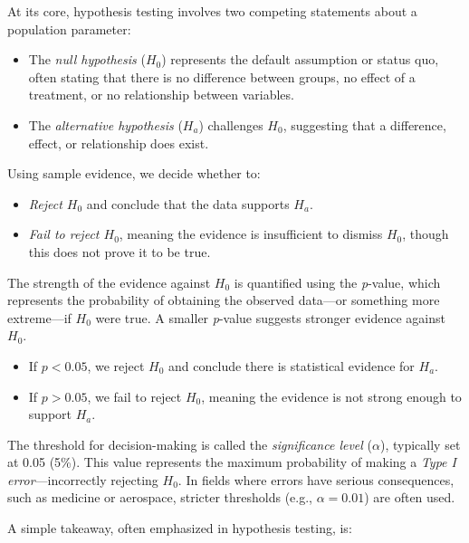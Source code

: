 \documentclass[
]{book}
\providecommand{\tightlist}{%
  \setlength{\itemsep}{0pt}\setlength{\parskip}{0pt}}
\theoremstyle{definition}
\theoremstyle{definition}
\theoremstyle{definition}
\theoremstyle{definition}
\theoremstyle{remark}
\begin{document}
At its core, hypothesis testing involves two competing statements about a population parameter:

\begin{itemize}
\tightlist
\item
  The \emph{null hypothesis} (\(H_0\)) represents the default assumption or status quo, often stating that there is no difference between groups, no effect of a treatment, or no relationship between variables.\\
\item
  The \emph{alternative hypothesis} (\(H_a\)) challenges \(H_0\), suggesting that a difference, effect, or relationship does exist.
\end{itemize}

Using sample evidence, we decide whether to:

\begin{itemize}
\tightlist
\item
  \emph{Reject \(H_0\)} and conclude that the data supports \(H_a\).\\
\item
  \emph{Fail to reject \(H_0\)}, meaning the evidence is insufficient to dismiss \(H_0\), though this does not prove it to be true.
\end{itemize}

The strength of the evidence against \(H_0\) is quantified using the \emph{p}-value, which represents the probability of obtaining the observed data---or something more extreme---if \(H_0\) were true. A smaller \emph{p}-value suggests stronger evidence against \(H_0\).

\begin{itemize}
\tightlist
\item
  If \(p < 0.05\), we reject \(H_0\) and conclude there is statistical evidence for \(H_a\).\\
\item
  If \(p > 0.05\), we fail to reject \(H_0\), meaning the evidence is not strong enough to support \(H_a\).
\end{itemize}

The threshold for decision-making is called the \emph{significance level} (\(\alpha\)), typically set at 0.05 (5\%). This value represents the maximum probability of making a \emph{Type I error}---incorrectly rejecting \(H_0\). In fields where errors have serious consequences, such as medicine or aerospace, stricter thresholds (e.g., \(\alpha = 0.01\)) are often used.

A simple takeaway, often emphasized in hypothesis testing, is:
\end{document}
